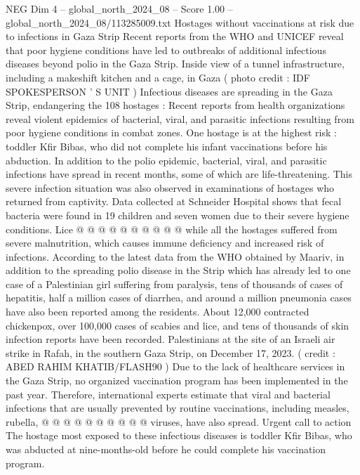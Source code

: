 \begin{textsample}{NEG Dim 4 – global\_north\_2024\_08 – Score 1.00 – global\_north\_2024\_08/113285009.txt}  \label{ex:f4_neg_292}
Hostages without vaccinations at risk due to infections in Gaza Strip Recent reports from the WHO and UNICEF reveal that poor hygiene conditions have led to outbreaks of additional infectious diseases beyond polio in the Gaza Strip.
Inside view of a tunnel infrastructure, including a makeshift kitchen and a cage, in Gaza ( photo credit : IDF SPOKESPERSON ' S UNIT ) Infectious diseases are spreading in the Gaza Strip, endangering the 108 hostages : Recent reports from health organizations reveal violent epidemics of bacterial, viral, and parasitic infections resulting from poor hygiene conditions in combat zones.
One hostage is at the highest risk : toddler Kfir Bibas, who did not complete his infant vaccinations before his abduction.
In addition to the polio epidemic, bacterial, viral, and parasitic infections have spread in recent months, some of which are life-threatening.
This severe infection situation was also observed in examinations of hostages who returned from captivity.
Data collected at Schneider Hospital shows that fecal bacteria were found in 19 children and seven women due to their severe hygiene conditions.
Lice @ @ @ @ @ @ @ @ @ @ while all the hostages suffered from severe malnutrition, which causes immune deficiency and increased risk of infections.
According to the latest data from the WHO obtained by Maariv, in addition to the spreading polio disease in the Strip which has already led to one case of a Palestinian girl suffering from paralysis, tens of thousands of cases of hepatitis, half a million cases of diarrhea, and around a million pneumonia cases have also been reported among the residents.
About 12,000 contracted chickenpox, over 100,000 cases of scabies and lice, and tens of thousands of skin infection reports have been recorded.
Palestinians at the site of an Israeli air strike in Rafah, in the southern Gaza Strip, on December 17, 2023. ( credit : ABED RAHIM KHATIB/FLASH90 ) Due to the lack of healthcare services in the Gaza Strip, no organized vaccination program has been implemented in the past year.
Therefore, international experts estimate that viral and bacterial infections that are usually prevented by routine vaccinations, including measles, rubella, @ @ @ @ @ @ @ @ @ @ viruses, have also spread.
Urgent call to action The hostage most exposed to these infectious diseases is toddler Kfir Bibas, who was abducted at nine-months-old before he could complete his vaccination program.

\end{textsample}
